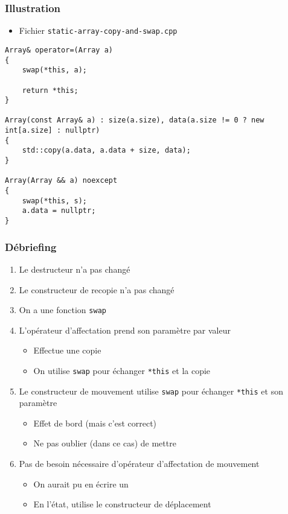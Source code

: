 \begin{frame}[containsverbatim]
\frametitle{Illustration}
\begin{itemize}
\item Fichier \texttt{static-array-copy-and-swap.cpp}
\end{itemize}
\begin{lstlisting}
Array& operator=(Array a)
{
	swap(*this, a);
            
	return *this;
}
    
Array(const Array& a) : size(a.size), data(a.size != 0 ? new int[a.size] : nullptr)
{
	std::copy(a.data, a.data + size, data);
}
    
Array(Array && a) noexcept
{
	swap(*this, s);
	a.data = nullptr;
}
\end{lstlisting}
\end{frame}

\begin{frame}
\frametitle{Débriefing}
\begin{enumerate}[<+->]
\item Le destructeur n'a pas changé
\item Le constructeur de recopie n'a pas changé
\item On a une fonction \texttt{swap}
\item L'opérateur d'affectation prend son paramètre par valeur
	\begin{itemize}
	\item Effectue une copie
	\item On utilise \texttt{swap} pour échanger \lstinline|*this| et la copie
	\end{itemize}
\item Le constructeur de mouvement utilise \texttt{swap} pour échanger \lstinline|*this| et son paramètre
	\begin{itemize}
	\item Effet de bord (mais c'est correct)
	\item Ne pas oublier (dans ce cas) de mettre 
	\end{itemize}
\item Pas de besoin nécessaire d'opérateur d'affectation de mouvement
	\begin{itemize}
	\item On aurait pu en écrire un
	\item En l'état, utilise le constructeur de déplacement
	\end{itemize}
\end{enumerate}
\end{frame}

